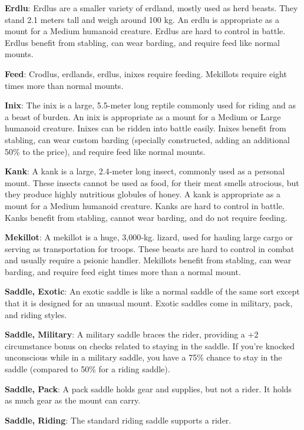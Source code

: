\textbf{Erdlu}: Erdlus are a smaller variety of erdland, mostly used as herd beasts. They stand 2.1 meters tall and weigh around 100 kg. An erdlu is appropriate as a mount for a Medium humanoid creature. Erdlus are hard to control in battle. Erdlus benefit from stabling, can wear barding, and require feed like normal mounts.

\textbf{Feed}: Crodlus, erdlands, erdlus, inixes require feeding. Mekillots require eight times more than normal mounts.

\textbf{Inix}: The inix is a large, 5.5-meter long reptile commonly used for riding and as a beast of burden. An inix is appropriate as a mount for a Medium or Large humanoid creature. Inixes can be ridden into battle easily. Inixes benefit from stabling, can wear custom barding (specially constructed, adding an additional 50\% to the price), and require feed like normal mounts.

\textbf{Kank}: A kank is a large, 2.4‐meter long insect, commonly used as a personal mount. These insects cannot be used as food, for their meat smells atrocious, but they produce highly nutritious globules of honey. A kank is appropriate as a mount for a Medium humanoid creature. Kanks are hard to control in battle. Kanks benefit from stabling, cannot wear barding, and do not require feeding.

\textbf{Mekillot}: A mekillot is a huge, 3,000‐kg. lizard, used for hauling large cargo or serving as transportation for troops. These beasts are hard to control in combat and usually require a psionic handler. Mekillots benefit from stabling, can wear barding, and require feed eight times more than a normal mount.

\textbf{Saddle, Exotic}: An exotic saddle is like a normal saddle of the same sort except that it is designed for an unusual mount. Exotic saddles come in military, pack, and riding styles.

\textbf{Saddle, Military}: A military saddle braces the rider, providing a +2 circumstance bonus on  checks related to staying in the saddle. If you're knocked unconscious while in a military saddle, you have a 75\% chance to stay in the saddle (compared to 50\% for a riding saddle).

\textbf{Saddle, Pack}: A pack saddle holds gear and supplies, but not a rider. It holds as much gear as the mount can carry.

\textbf{Saddle, Riding}: The standard riding saddle supports a rider.